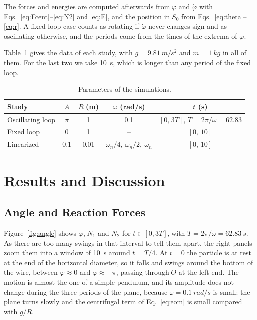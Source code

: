 \documentclass[11pt,a4paper]{article}
\numberwithin{equation}{section}
\newcommand{\dph}{\dot\varphi}
\begin{document}
The forces and energies are computed afterwards from $\varphi$ and $\dph$ with Eqs.~\eqref{eq:Fcent}--\eqref{eq:N2} and \eqref{eq:E}, and the position in $S_0$ from Eqs.~\eqref{eq:theta}--\eqref{eq:r}. A fixed-loop case counts as rotating if $\dph$ never changes sign and as oscillating otherwise, and the periods come from the times of the extrema of $\varphi$.

Table~\ref{tab:params} gives the data of each study, with $g=\SI{9.81}{m/s^2}$ and $m=\SI{1}{kg}$ in all of them. For the last two we take \SI{10}{s}, which is longer than any period of the fixed loop.

\begin{table}[!htb]
\centering\small
\caption{Parameters of the simulations.}\label{tab:params}
\begin{tabular}{lcccc}
\toprule
Study & $A$ & $R$ (m) & $\omega$ (rad/s) & $t$ (s)\\
\midrule
Oscillating loop & $\pi$ & 1 & 0.1 & $[0,\,3T]$, $T=2\pi/\omega=62.83$\\
Fixed loop & 0 & 1 & -- & $[0,\,10]$\\
Linearized & 0.1 & 0.01 & $\omega_n/4,\ \omega_n/2,\ \omega_n$ & $[0,\,10]$\\
\bottomrule
\end{tabular}
\end{table}

\section{Results and Discussion}\label{sec:results}
\subsection{Angle and Reaction Forces}
Figure~\ref{fig:angle} shows $\varphi$, $N_1$ and $N_2$ for $t\in[0,3T]$, with $T=2\pi/\omega=\SI{62.83}{s}$. As there are too many swings in that interval to tell them apart, the right panels zoom them into a window of \SI{10}{s} around $t=T/4$. At $t=0$ the particle is at rest at the end of the horizontal diameter, so it falls and swings around the bottom of the wire, between $\varphi\approx0$ and $\varphi\approx-\pi$, passing through $O$ at the left end. The motion is almost the one of a simple pendulum, and its amplitude does not change during the three periods of the plane, because $\omega=\SI{0.1}{rad/s}$ is small: the plane turns slowly and the centrifugal term of Eq.~\eqref{eq:eom} is small compared with $g/R$.
\end{document}
